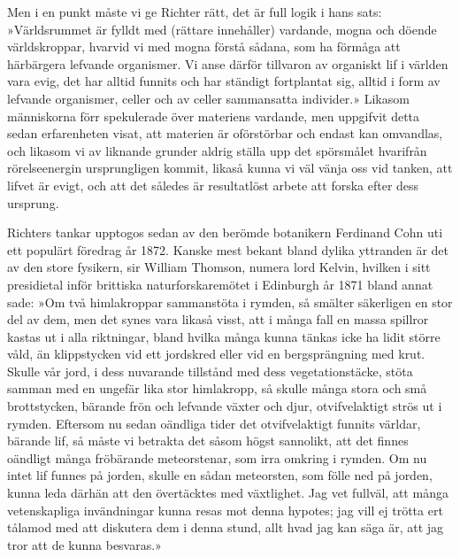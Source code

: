 \documentclass[a4paper, 12pt, oneside, swedish]{article}
\begin{document}
Men i en punkt måste vi ge Richter rätt, det är full logik i hans sats: »Världsrummet är fylldt med (rättare innehåller) vardande, mogna och döende världskroppar, hvarvid vi med mogna förstå sådana, som ha förmåga att härbärgera lefvande organismer. Vi anse därför tillvaron av organiskt lif i världen vara evig, det har alltid funnits och har ständigt fortplantat sig, alltid i form av lefvande organismer, celler och av celler sammansatta individer.» Likasom människorna förr spekulerade över materiens vardande, men uppgifvit detta sedan erfarenheten visat, att materien är oförstörbar och endast kan omvandlas, och likasom vi av liknande grunder aldrig ställa upp det spörsmålet hvarifrån rörelseenergin ursprungligen kommit, likaså kunna vi väl vänja oss vid tanken, att lifvet är evigt, och att det således är resultatlöst arbete att forska efter dess ursprung.

Richters tankar upptogos sedan av den berömde botanikern Ferdinand Cohn uti ett populärt föredrag år 1872. Kanske mest bekant bland dylika yttranden är det av den store fysikern, sir William Thomson, numera lord Kelvin, hvilken i sitt presidietal inför brittiska naturforskaremötet i Edinburgh år 1871 bland annat sade: »Om två himlakroppar sammanstöta i rymden, så smälter säkerligen en stor del av dem, men det synes vara likaså visst, att i många fall en massa spillror kastas ut i alla riktningar, bland hvilka många kunna tänkas icke ha lidit större våld, än klippstycken vid ett jordskred eller vid en bergsprängning med krut. Skulle vår jord, i dess nuvarande tillstånd med dess vegetationstäcke, stöta samman med en ungefär lika stor himlakropp, så skulle många stora och små brottstycken, bärande frön och lefvande växter och djur, otvifvelaktigt strös ut i rymden. Eftersom nu sedan oändliga tider det otvifvelaktigt funnits världar, bärande lif, så måste vi betrakta det såsom högst sannolikt, att det finnes oändligt många fröbärande meteorstenar, som irra omkring i rymden. Om nu intet lif funnes på jorden, skulle en sådan meteorsten, som fölle ned på jorden, kunna leda därhän att den övertäcktes med växtlighet. Jag vet fullväl, att många vetenskapliga invändningar kunna resas mot denna hypotes; jag vill ej trötta ert tålamod med att diskutera dem i denna stund, allt hvad jag kan säga är, att jag tror att de kunna besvaras.»
\end{document}
